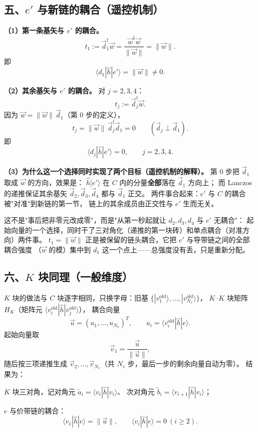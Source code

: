\documentclass[11pt]{ctexart}
\begin{document}
\subsection{五、$e'$ 与新链的耦合（遥控机制）}

\textbf{（1）第一条基矢与 $e'$ 的耦合。}
\[
t_1:=\vec d_1^{\dagger}\vec w
=
\frac{\vec w^{\dagger}\vec w}{\|\vec w\|}
=
\|\vec w\| .
\]
即
\[
\langle d_1|\hat h|e'\rangle=\|\vec w\|\neq0 .
\]

\textbf{（2）其余基矢与 $e'$ 的耦合。}
对 $j=2,3,4$：
\[
t_j:=\vec d_j^{\dagger}\vec w .
\]
因为 $\vec w=\|\vec w\|\,\vec d_1$（第 0 步的定义），
\[
t_j=\|\vec w\|\,\vec d_j^{\dagger}\vec d_1
=
0
\qquad(\vec d_j\perp\vec d_1).
\]
即
\[
\langle d_j|\hat h|e'\rangle=0,\qquad j=2,3,4 .
\]

\textbf{（3）为什么这一个选择同时实现了两个目标（遥控机制的解释）。}
第 0 步把 $\vec d_1$ 取成 $\vec w$ 的方向，效果是：
$\hat h|e'\rangle$ 在 $C$ 内的分量\textbf{全部}落在 $\vec d_1$ 方向上；
而 Lanczos 的递推保证其余基矢 $\vec d_2,\vec d_3,\vec d_4$ 都与 $\vec d_1$ 正交。
两件事合起来：$e'$ 与 $C$ 的耦合被"对准"到新链的第一节，
链上的其余成员由正交性与 $e'$ 生而无关。

这不是"事后把非零元改成零"，而是"从第一秒起就让 $d_2,d_3,d_4$ 与 $e'$ 无耦合"：
起始向量的一个选择，同时干了三对角化（递推的第一块砖）和单点耦合（对准方向）两件事。
$t_1=\|\vec w\|$ 正是被保留的链头耦合，它把 $e'$ 与导带链之间的全部耦合强度
（$\vec w$ 的模）集中到 $d_1$ 这一个点上——总强度没有丢，只是重新分配。

\subsection{六、$K$ 块同理（一般维度）}

$K$ 块的做法与 $C$ 块逐字相同，只换字母：旧基
$\{|v_1^{\mathrm{old}}\rangle,\dots,|v_{N_v}^{\mathrm{old}}\rangle\}$，
$K$--$K$ 块矩阵 $H_K$（矩阵元 $\langle v_i^{\mathrm{old}}|\hat h|v_j^{\mathrm{old}}\rangle$），
耦合向量
\[
\vec u=(u_1,\dots,u_{N_v})^{T},
\qquad
u_i=\langle v_i^{\mathrm{old}}|\hat h|e\rangle .
\]
起始向量取
\[
\vec v_1=\frac{\vec u}{\|\vec u\|} ,
\]
随后按三项递推生成 $\vec v_2,\dots,\vec v_{N_v}$（共 $N_v$ 步，最后一步的剩余向量自动为零）。
结果为：

$K$ 块三对角，记对角元 $\tilde a_i=\langle v_i|\hat h|v_i\rangle$、
次对角元 $\tilde b_i=\langle v_{i+1}|\hat h|v_i\rangle$；

$e$ 与价带链的耦合：
\[
\langle v_1|\hat h|e\rangle=\|\vec u\|,\qquad
\langle v_i|\hat h|e\rangle=0\ (i\ge2).
\]
\end{document}
